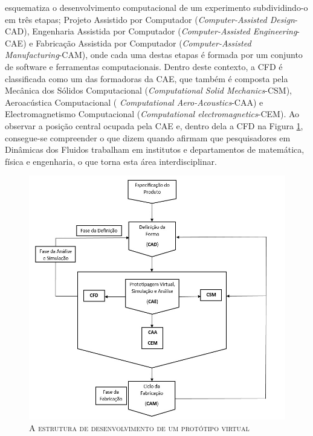  esquematiza o desenvolvimento computacional de um experimento subdividindo-o em três etapas; Projeto Assistido por Computador (\textit{Computer-Assisted Design}-CAD), Engenharia Assistida por Computador (\textit{Computer-Assisted Engineering}-CAE) e Fabricação Assistida por Computador (\textit{Computer-Assisted Manufacturing}-CAM), onde cada uma destas etapas é formada por um conjunto de software e ferramentas computacionais. Dentro deste contexto, a CFD é classificada como um das formadoras da CAE, que também é composta pela Mecânica dos Sólidos Computacional (\textit{Computational Solid Mechanics}-CSM), Aeroacústica Computacional ( \textit{Computational Aero-Acoustics}-CAA) e Electromagnetismo Computacional (\textit{Computational electromagnetics}-CEM). Ao observar a posição central ocupada pela CAE e, dentro dela a CFD na Figura \ref{fig:esquema_CAE}, consegue-se compreender o que dizem  quando afirmam que pesquisadores em Dinâmicas dos Fluidos trabalham em institutos e departamentos de matemática, física e engenharia, o que torna esta área interdisciplinar.

\begin{figure}[H]
	\centering
	\includegraphics[scale=0.8]{figuras/esquema_CAE.jpg}
	\caption{\textsc{A estrutura de desenvolvimento de um protótipo virtual} }
	\vspace{-0.1cm}
	\label{fig:esquema_CAE}
\end{figure}

